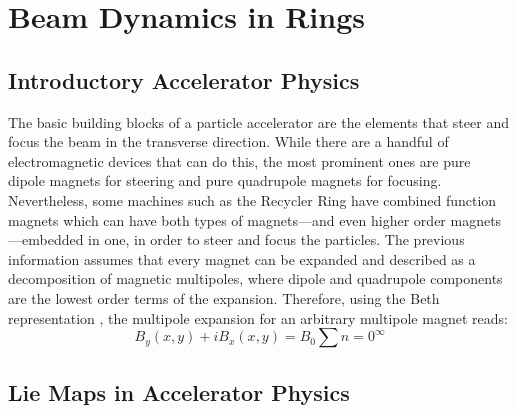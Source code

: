 \chapter{Beam Dynamics in Rings}
\label{sec:ch2}

\section{\label{sec:basic}Introductory Accelerator Physics}
The basic building blocks of a particle accelerator are the elements that steer and focus the beam in the transverse direction. While there are a handful of electromagnetic devices that can do this, the most prominent ones are pure dipole magnets for steering and pure quadrupole magnets for focusing. Nevertheless, some machines such as the Recycler Ring have combined function magnets which can have both types of magnets---and even higher order magnets---embedded in one, in order to steer and focus the particles. The previous information assumes that every magnet can be expanded and described as a decomposition of magnetic multipoles, where dipole and quadrupole components are the lowest order terms of the expansion. Therefore, using the Beth representation \cite{sylee}, the multipole expansion for an arbitrary multipole magnet reads:
\begin{equation}
    \label{eq:ch2magnet}
    B_y(x,y)+iB_x(x,y)=B_0 \sum{n=0}^{\infty} 
\end{equation}

\section{\label{sec:lie}Lie Maps in Accelerator Physics}

